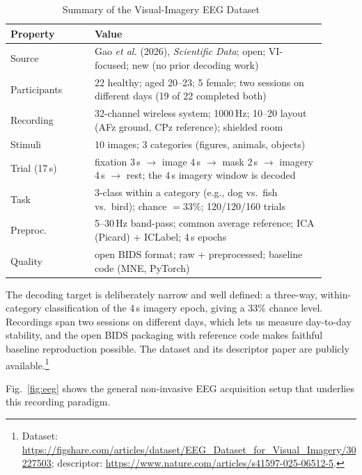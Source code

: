 \documentclass[conference]{IEEEtran}
\begin{document}
\begin{table}[t]
  \caption{Summary of the Visual-Imagery EEG Dataset~\cite{gao2026}}
  \label{tab:dataset}
  \centering
  \renewcommand{\arraystretch}{1.25}
  \begin{tabular}{@{}p{0.24\linewidth} p{0.66\linewidth}@{}}
    \toprule
    \textbf{Property} & \textbf{Value} \\
    \midrule
    Source        & Gao \textit{et al.} (2026), \textit{Scientific Data};
                    open; VI-focused; new (no prior decoding work) \\
    Participants  & 22 healthy; aged 20--23; 5 female; two sessions on
                    different days (19 of 22 completed both) \\
    Recording     & 32-channel wireless system; 1000\,Hz; 10--20 layout
                    (AFz ground, CPz reference); shielded room \\
    Stimuli       & 10 images; 3 categories (figures, animals, objects) \\
    Trial (17\,s) & fixation 3\,s $\rightarrow$ image 4\,s $\rightarrow$
                    mask 2\,s $\rightarrow$ imagery 4\,s $\rightarrow$ rest;
                    the 4\,s imagery window is decoded \\
    Task          & 3-class within a category (e.g., dog vs.\ fish vs.\
                    bird); chance $=33\%$; 120/120/160 trials \\
    Preproc.      & 5--30\,Hz band-pass; common average reference;
                    ICA (Picard) + ICLabel; 4\,s epochs \\
    Quality       & open BIDS format; raw + preprocessed; baseline code
                    (MNE, PyTorch) \\
    \bottomrule
  \end{tabular}
\end{table}

The decoding target is deliberately narrow and well defined: a three-way,
within-category classification of the 4\,s imagery epoch, giving a 33\%
chance level. Recordings span two sessions on different days, which lets us
measure day-to-day stability, and the open BIDS packaging with reference
code makes faithful baseline reproduction possible. The dataset and its
descriptor paper are publicly available.\footnote{Dataset:
\url{https://figshare.com/articles/dataset/EEG_Dataset_for_Visual_Imagery/30227503};
descriptor: \url{https://www.nature.com/articles/s41597-025-06512-5}.}

Fig.~\ref{fig:eeg} shows the general non-invasive EEG acquisition setup that
underlies this recording paradigm.
\end{document}
